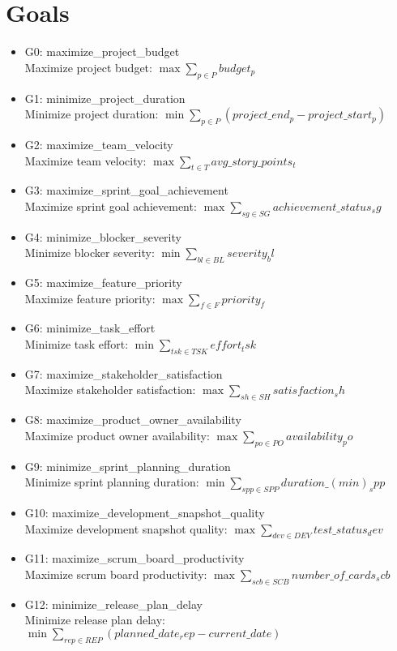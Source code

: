 \documentclass{article}
\begin{document}
\section{Goals}
\begin{itemize}
    \item G0: maximize\_project\_budget \\
    Maximize project budget: $\max \sum_{p \in P} budget_p$
    \item G1: minimize\_project\_duration \\
    Minimize project duration: $\min \sum_{p \in P} (project\_end_p - project\_start_p)$
    \item G2: maximize\_team\_velocity \\
    Maximize team velocity: $\max \sum_{t \in T} avg\_story\_points_t$
    \item G3: maximize\_sprint\_goal\_achievement \\
    Maximize sprint goal achievement: $\max \sum_{sg \in SG} achievement\_status_sg$
    \item G4: minimize\_blocker\_severity \\
    Minimize blocker severity: $\min \sum_{bl \in BL} severity_bl$
    \item G5: maximize\_feature\_priority \\
    Maximize feature priority: $\max \sum_{f \in F} priority_f$
    \item G6: minimize\_task\_effort \\
    Minimize task effort: $\min \sum_{tsk \in TSK} effort_tsk$
    \item G7: maximize\_stakeholder\_satisfaction \\
    Maximize stakeholder satisfaction: $\max \sum_{sh \in SH} satisfaction_sh$
    \item G8: maximize\_product\_owner\_availability \\
    Maximize product owner availability: $\max \sum_{po \in PO} availability_po$
    \item G9: minimize\_sprint\_planning\_duration \\
    Minimize sprint planning duration: $\min \sum_{spp \in SPP} duration\_(min)_spp$
    \item G10: maximize\_development\_snapshot\_quality \\
    Maximize development snapshot quality: $\max \sum_{dev \in DEV} test\_status_dev$
    \item G11: maximize\_scrum\_board\_productivity \\
    Maximize scrum board productivity: $\max \sum_{scb \in SCB} number\_of\_cards_scb$
    \item G12: minimize\_release\_plan\_delay \\
    Minimize release plan delay: $\min \sum_{rep \in REP} (planned\_date_rep - current\_date)$
\end{itemize}
\end{document}
